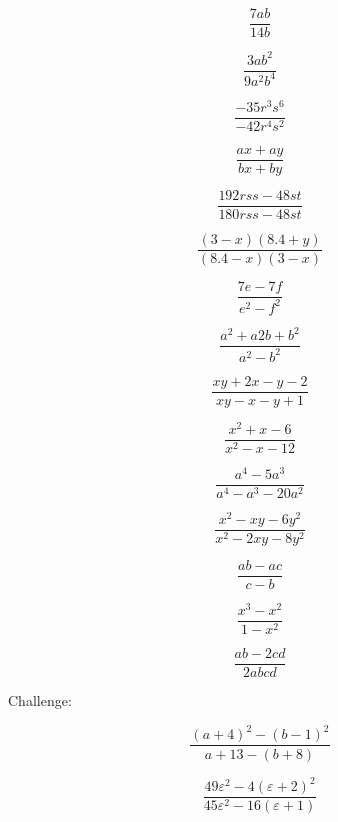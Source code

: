 \begin{bbwAufgabenBlock}
\item $$\frac{7ab}{14b}$$

\item $$\frac{3ab^2}{9a^2b^4}$$

\item $$\frac{-35r^3s^6}{-42r^4s^2}$$

\item $$\frac{ax+ay}{bx+by}$$

\item $$\frac{192rss-48st}{180rss-48st}$$

\item $$\frac{(3-x)(8.4+y)}{(8.4-x)(3-x)}$$

\item $$\frac{7e-7f}{e^2-f^2}$$

\item $$\frac{a^2+a2b+b^2}{a^2-b^2}$$

\item $$\frac{xy+2x-y-2}{xy-x-y+1}$$

\item $$\frac{x^2+x-6}{x^2-x-12}$$

\item $$\frac{a^4-5a^3}{a^4-a^3-20a^2}$$

\item $$\frac{x^2-xy-6y^2}{x^2-2xy-8y^2}$$

\item $$\frac{ab-ac}{c-b}$$

\item $$\frac{x^3-x^2}{1-x^2}$$

\item $$\frac{ab-2cd}{2abcd}$$

\vspace{3mm}
Challenge:

\item $$\frac{(a+4)^2-(b-1)^2}{a+13-(b+8)}$$


\item $$\frac{49\varepsilon^2 - 4(\varepsilon+2)^2}{45\varepsilon^2 - 16(\varepsilon+1)}$$


\end{bbwAufgabenBlock}
\newpage
